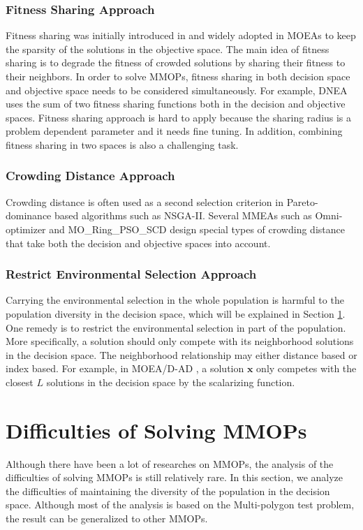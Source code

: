 \documentclass[conference]{IEEEtran}
\begin{document}
\subsubsection{Fitness Sharing Approach}
Fitness sharing was initially introduced in \cite{goldberg1987genetic} and widely adopted in MOEAs to keep the sparsity of the solutions in the objective space. The main idea of fitness sharing is to degrade the fitness of crowded solutions by sharing their fitness to their neighbors. In order to solve MMOPs, fitness sharing in both decision space and objective space needs to be considered simultaneously. For example, DNEA\cite{liu2018double} uses the sum of two fitness sharing functions both in the decision and objective spaces. Fitness sharing approach is hard to apply because the sharing radius is a problem dependent parameter and it needs fine tuning. In addition, combining fitness sharing in two spaces is also a challenging task.
\subsubsection{Crowding Distance Approach}
Crowding distance is often used as a second selection criterion in Pareto-dominance based algorithms such as NSGA-II\cite{deb2002fast}. Several MMEAs such as Omni-optimizer\cite{deb2005omni} and MO\_Ring\_PSO\_SCD\cite{yue2017multiobjective} design special types of crowding distance that take both the decision and objective spaces into account.
\subsubsection{Restrict Environmental Selection Approach}
Carrying the environmental selection in the whole population is harmful to the population diversity in the decision space, which will be explained in Section \ref{Difficulties Analysis}. One remedy is to restrict the environmental selection in part of the population. More specifically, a solution should only compete with its neighborhood solutions in the decision space. The neighborhood relationship may either distance based or index based. For example, in MOEA/D-AD \cite{tanabe2018decomposition}, a solution $\boldsymbol{x}$ only competes with the closest $L$ solutions in the decision space by the scalarizing function.

\section{Difficulties of Solving MMOPs}
\label{Difficulties Analysis}
Although there have been a lot of researches on MMOPs, the analysis of the difficulties of solving MMOPs is still relatively rare. In this section, we analyze the difficulties of maintaining the diversity of the population in the decision space. Although most of the analysis is based on the Multi-polygon test problem, the result can be generalized to other MMOPs. 
\end{document}
